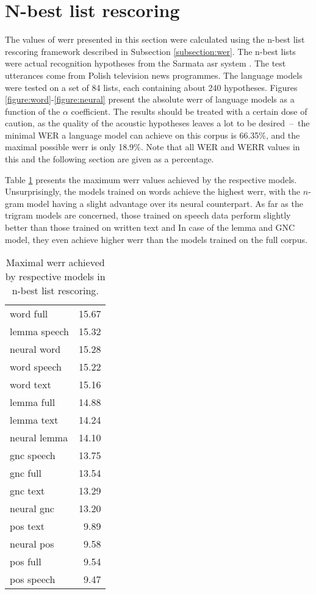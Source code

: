 \section{N-best list rescoring}
\label{section:nbest}
The values of \gls{werr} presented in this section were calculated using the n-best list rescoring framework described in Subsection \ref{subsection:wer}. The n-best lists were actual recognition hypotheses from the Sarmata \gls{asr} system \cite{ziolko2011automatic}. The test utterances come from Polish television news programmes. The language models were tested on a set of 84 lists, each containing about 240 hypotheses. Figures \ref{figure:word}-\ref{figure:neural} present the absolute \gls{werr} of language models as a function of the $\alpha$ coefficient. The results should be treated with a certain dose of caution, as the quality of the acoustic hypotheses leaves a lot to be desired~--~the minimal WER a language model can achieve on this corpus is 66.35\%, and the maximal possible \gls{werr} is only 18.9\%. Note that all WER and WERR values in this and the following section are given as a percentage.

Table \ref{table:max_werr} presents the maximum \gls{werr} values achieved by the respective models. Unsurprisingly, the models trained on words achieve the highest \gls{werr}, with the \mbox{$n$-gram} model having a slight advantage over its neural counterpart. As far as the trigram models are concerned, those trained on speech data perform slightly better than those trained on written text and In case of the lemma and GNC model, they even achieve higher \gls{werr} than the models trained on the full corpus.

\begin{table}[!htbp]
	\centering
	\caption[Maximal WERR achieved by respective models in \mbox{n-best} list rescoring]{Maximal \gls{werr} achieved by respective models in n-best list rescoring.}
	\label{table:max_werr}
	\begin{tabular*}{.4\linewidth}{@{\extracolsep{\fill}}lr}
		word full    & 15.67\\
		lemma speech  & 15.32\\
		neural word   & 15.28\\
		word speech  & 15.22\\
		word text    & 15.16\\
		lemma full    & 14.88\\
		lemma text    & 14.24\\
		neural lemma  & 14.10\\
		gnc speech & 13.75\\
		gnc full   & 13.54\\
		gnc text   & 13.29\\
		neural gnc    & 13.20\\
		pos text   & 9.89\\
		neural pos    & 9.58\\
		pos full   & 9.54\\
		pos speech & 9.47\\
	\end{tabular*}
\end{table}

